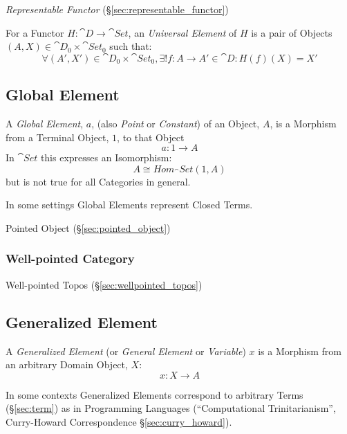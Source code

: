 \emph{Representable Functor} (\S\ref{sec:representable_functor})

For a Functor $H : \cat{D} \rightarrow \cat{Set}$, an
\emph{Universal Element} of $H$ is a pair of Objects $(A,X) \in
\cat{D}_0 \times \cat{Set}_0$ such that:
\[
  \forall (A',X') \in \cat{D}_0 \times \cat{Set}_0,
  \exists! f : A \rightarrow A' \in \cat{D} : H(f)(X) = X'
\]



\subsection{Global Element}\label{sec:global_element}

A \emph{Global Element}, $a$, (also \emph{Point} or \emph{Constant})
of an Object, $A$, is a Morphism from a Terminal Object, $1$, to that
Object
\[
  a: 1 \rightarrow A
\]
In $\cat{Set}$ this expresses an Isomorphism:
\[
  A \cong Hom_\cat{Set}(1,A)
\]
but is not true for all Categories in general.

In some settings Global Elements represent Closed Terms.

Pointed Object (\S\ref{sec:pointed_object})



\subsubsection{Well-pointed Category}\label{sec:well_pointed}

Well-pointed Topos (\S\ref{sec:wellpointed_topos})



\subsection{Generalized Element}\label{sec:generalized_element}

A \emph{Generalized Element} (or \emph{General Element} or
\emph{Variable}) $x$ is a Morphism from an arbitrary Domain Object,
$X$:
\[
  x: X \rightarrow A
\]

In some contexts Generalized Elements correspond to arbitrary Terms
(\S\ref{sec:term}) as in Programming Languages (``Computational
Trinitarianism'', Curry-Howard Correspondence
\S\ref{sec:curry_howard}).



